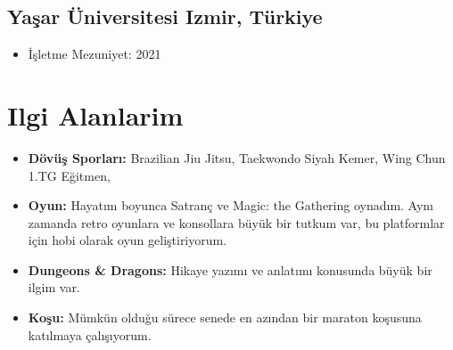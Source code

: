 \documentclass[11pt]{article}
\newcommand{\rside}[1]{
  \hfill {\normalfont\color{accent} #1}%
}
\begin{document}
\subsection{Yaşar Üniversitesi \rside{Izmir, Türkiye}}
\begin{itemize}
    \item{İşletme \rside{Mezuniyet: 2021}}
\end{itemize}
\section{Ilgi Alanlarim}
\begin{itemize}
    \item \textbf{Dövüş Sporları:} Brazilian Jiu Jitsu, Taekwondo Siyah Kemer, Wing Chun 1.TG Eğitmen, 
    \item \textbf{Oyun:} Hayatım boyunca Satranç ve Magic: the Gathering oynadım. Aynı zamanda retro oyunlara ve konsollara büyük bir tutkum var, bu platformlar için hobi olarak oyun geliştiriyorum. 
    \item \textbf{Dungeons \& Dragons:} Hikaye yazımı ve anlatımı konusunda büyük bir ilgim var.
    \item \textbf{Koşu:} Mümkün olduğu sürece senede en azından bir maraton koşusuna katılmaya çalışıyorum.
\end{itemize}
\end{document}

